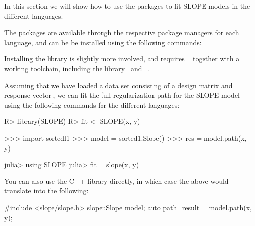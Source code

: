 \documentclass[article]{jss}
\begin{document}
In this section we will show how to use the packages to fit SLOPE models in
the different languages.

The packages are
available through the respective package managers for each language, and can be
be installed using the following commands:

\begin{description}[labelwidth=8ex]
  \item[\proglang{R}] 
  \item[\proglang{Python}] 
  \item[\proglang{Julia}] 
\end{description}

Installing the  library is slightly more involved, and requires
~\citep{kitware2025} together with a working  toolchain, including
the  library~\citep{guennebaud2010a} and ~\citep{dagum1998}.

Assuming that we have loaded a data set consisting of a design
matrix  and response vector , we can fit the full regularization
path for the SLOPE model using the following commands for the different languages:

\begin{minipage}[t]{0.25\textwidth}%
  \textbf{}
  \begin{Code}
R> library(SLOPE)
R> fit <- SLOPE(x, y)
  \end{Code}
\end{minipage}
\hfill
\begin{minipage}[t]{0.32\textwidth}

  \textbf{}
  \begin{Code}
>>> import sortedl1
>>> model = sorted1.Slope()
>>> res = model.path(x, y)
  \end{Code}
\end{minipage}
\hfill
\begin{minipage}[t]{0.32\textwidth}
  \textbf{}
  \begin{Code}
julia> using SLOPE
julia> fit = slope(x, y)
  \end{Code}
\end{minipage}

\medskip

You can also use the C++ library directly, in
which case the above would translate into the
following:
\begin{Code}
#include <slope/slope.h>
slope::Slope model;
auto path_result = model.path(x, y);
\end{Code}
\end{document}
